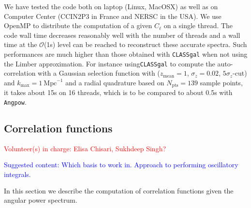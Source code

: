\documentclass[\docopts]{\docclass}
\newcommand{\vol}[1]{\textcolor{red}{Volunteer(s) in charge: #1}}
\newcommand{\cont}[1]{\textcolor{blue}{Suggested content: #1}}
\newcommand{\mrm}[1]{\mathrm{#1}}
\begin{document}
We have tested the code both on laptop (Linux, MacOSX) as well as on
Computer Center (CCIN2P3 in France and NERSC in the USA).
We use OpenMP to distribute the computation of a given $C_\ell$ on a single
thread. The code wall time  decreases reasonably well with the number of threads
and a wall time at the $\mathcal{O}$(1s) level can be reached to
reconstruct these accurate spectra. Such performances are much higher than those obtained
with {\tt CLASSgal} when not using the Limber approximation.
For instance using{\tt CLASSgal}  to compute the auto-correlation with a Gaussian selection function with ($z_\mrm{mean}=1$, $\sigma_z=0.02$, $5\sigma_z$-cut) and $k_\mrm{max}=1\ \mrm{Mpc}^{-1}$ and a radial quadrature based on $N_\mrm{pts}=139$ sample points, it takes
about 15s on 16 threads, which is to be compared to about 0.5s with \texttt{Angpow}.



\subsection{Correlation functions}
\vol{Elisa Chisari, Sukhdeep Singh?}

\cont{Which basis to work in. Approach to performing oscillatory integrals.}

In this section we describe the computation of correlation functions given the angular power
spectrum.
\end{document}
